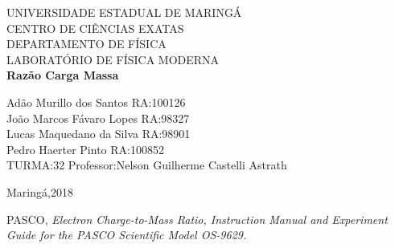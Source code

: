 \documentclass[a4paper,10pt]{article}
\begin{document}
	
	\begin{titlepage}
		\begin{center}
		{\large UNIVERSIDADE ESTADUAL DE MARINGÁ}\\[0.2cm]
		{\large CENTRO DE CIÊNCIAS EXATAS}\\[0.2cm]
		{\large DEPARTAMENTO DE FÍSICA}\\[0.2cm]
		{\large LABORATÓRIO DE FÍSICA MODERNA}\\[7.0cm]
		{\bf \huge Razão Carga Massa}\\[7.0cm]
		\end{center}
	{\large Adão Murillo dos Santos \hfill RA:100126}\\[0.7cm]
	{\large João Marcos Fávaro Lopes \hfill RA:98327}\\[0.7cm]
	{\large Lucas Maquedano da Silva \hfill RA:98901}\\[0.7cm]
	{\large Pedro Haerter Pinto \hfill RA:100852}\\[0.7cm]
	{\large TURMA:32 \hfill Professor:Nelson Guilherme Castelli
	Astrath}
	
	\vfill
		\begin{center}
		{\large Maringá,2018}
		\end{center}
	\end{titlepage}

	\tableofcontents
	
	
		
	
\vspace{3cm}
	\begin{thebibliography}{1}
    	PASCO, \it{Electron Charge-to-Mass Ratio}, Instruction Manual and 	Experiment Guide for the PASCO Scientific Model OS-9629.
	\end{thebibliography}	
	
\end{document}
